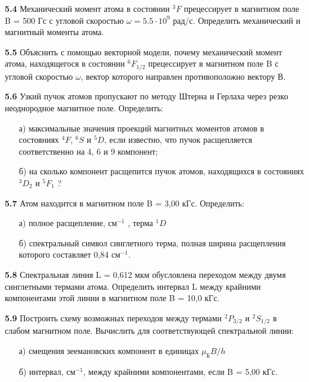 	\textbf{5.4 }
		Механический момент атома в состоянии \( ^3F \) прецессирует 
		в магнитном поле B = 500 Гс с угловой скоростью 
		\( \omega = 5.5\cdot10^9 \) рад/с. Определить механический 
		и магнитный моменты атома.

	\textbf{5.5 }
		Объяснить с помощью векторной модели, почему механический момент
		атома, находящегося в состоянии \(^6F_{1/2} \) прецессирует в 
		магнитном поле B с угловой скоростью \( \omega \), вектор 
		которого направлен противоположно вектору В.

	\textbf{5.6 }
		Узкий пучок атомов пропускают по методу Штерна и Герлаха через резко
		неоднородное магнитное поле. Определить: 
		\vspace*{-1em}
		\begin{itemize}\itemsep-8pt
			\item[а)] максимальные значения проекций магнитных моментов 
			атомов в состояниях \(^4F \), \( ^6S \) и \( ^5D \), если
			известно, что пучок расщепляется соответственно на 4, 6 и 9 компонент;
			\item[б)] на сколько компонент расщепится пучок атомов, 
			находящихся в состояниях \( ^3D_2 \) и \( ^5F_1 \) ?
		\end{itemize}

	\textbf{5.7 }
		Атом находится в магнитном поле B = 3,00 кГс. Определить: 
		\vspace*{-1em}
		\begin{itemize}\itemsep-8pt
			\item[а)] полное расщепление, \( \text{см}^{-1} \) , терма \( ^1D \) 
			\item[б)] спектральный символ синглетного терма,
			полная ширина расщепления которого составляет 0,84 \( \text{см}^{-1} \).
		\end{itemize}

	\textbf{5.8 }
		Спектральная линия L = 0,612 мкм обусловлена переходом между двумя
		синглетными термами атома. Определить интервал L между крайними
		компонентами этой линии в магнитном поле B = 10,0 кГс.

	\textbf{5.9 }
		Построить схему возможных переходов между термами \( ^2P_{3/2} \) и 
		\( ^2S_{1/2} \) в слабом магнитном поле. Вычислить для соответствующей 
		спектральной линии:
		\vspace*{-2em}
		\begin{itemize}\itemsep-8pt
			\item[а)] смещения зеемановских компонент в единицах 
			\( \mu_\text{Б}B/h \)
			\item[б)] интервал, \( \text{см}^{-1} \), между крайними 
			компонентами, если B = 5,00 кГс.
		\end{itemize}

